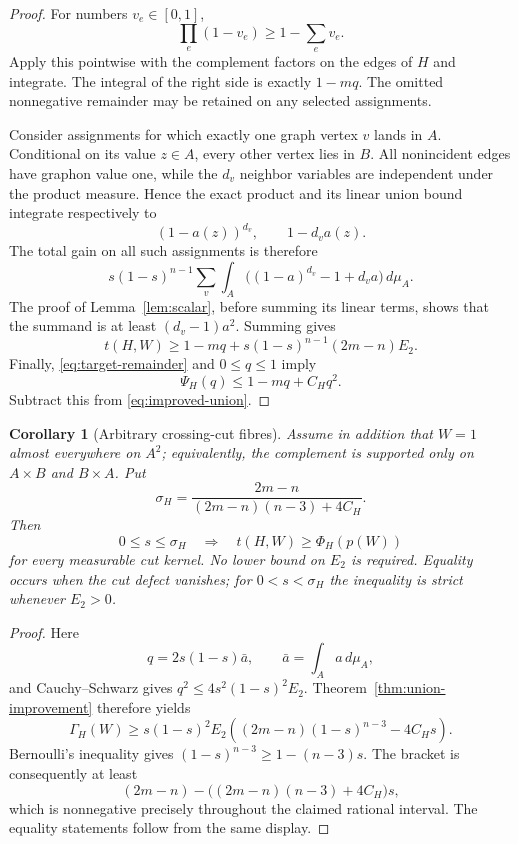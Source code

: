 \documentclass[11pt]{article}
\newtheorem{corollary}[theorem]{Corollary}
\newcommand{\dd}{\,d}
\begin{document}
\begin{proof}
For numbers $v_e\in[0,1]$,
\[
 \prod_e(1-v_e)\geq1-\sum_ev_e.
\]
Apply this pointwise with the complement factors on the edges of $H$ and
integrate.  The integral of the right side is exactly $1-mq$.  The omitted
nonnegative remainder may be retained on any selected assignments.

Consider assignments for which exactly one graph vertex $v$ lands in $A$.
Conditional on its value $z\in A$, every other vertex lies in $B$.  All
nonincident edges have graphon value one, while the $d_v$ neighbor variables
are independent under the product measure.  Hence the exact product and its
linear union bound integrate respectively to
\[
 (1-a(z))^{d_v},
 \qquad1-d_va(z).
\]
The total gain on all such assignments is therefore
\[
 s(1-s)^{n-1}\sum_v\int_A
 \bigl((1-a)^{d_v}-1+d_va\bigr)\dd\mu_A.
\]
The proof of Lemma~\ref{lem:scalar}, before summing its linear terms, shows
that the summand is at least $(d_v-1)a^2$.  Summing gives
\begin{equation}
 t(H,W)\geq1-mq+s(1-s)^{n-1}(2m-n)E_2.
 \label{eq:improved-union}
\end{equation}
Finally, \eqref{eq:target-remainder} and $0\leq q\leq1$ imply
\[
 \Psi_H(q)\leq1-mq+C_Hq^2.
\]
Subtract this from \eqref{eq:improved-union}.
\end{proof}

\begin{corollary}[Arbitrary crossing-cut fibres]
\label{cor:cut-only}
Assume in addition that $W=1$ almost everywhere on $A^2$; equivalently, the
complement is supported only on $A\times B$ and $B\times A$.  Put
\begin{equation}
 \sigma_H=
 \frac{2m-n}{(2m-n)(n-3)+4C_H}.
 \label{eq:fixed-radius}
\end{equation}
Then
\[
 0\leq s\leq\sigma_H
 \quad\Longrightarrow\quad
 t(H,W)\geq\Phi_H(p(W))
\]
for every measurable cut kernel.  No lower bound on $E_2$ is required.
Equality occurs when the cut defect vanishes; for $0<s<\sigma_H$ the
inequality is strict whenever $E_2>0$.
\end{corollary}

\begin{proof}
Here
\[
 q=2s(1-s)\bar a,
 \qquad \bar a=\int_Aa\dd\mu_A,
\]
and Cauchy--Schwarz gives $q^2\leq4s^2(1-s)^2E_2$.
Theorem~\ref{thm:union-improvement} therefore yields
\[
 \Gamma_H(W)\geq
 s(1-s)^2E_2
 \left((2m-n)(1-s)^{n-3}-4C_Hs\right).
\]
Bernoulli's inequality gives
$(1-s)^{n-3}\geq1-(n-3)s$.  The bracket is consequently at least
\[
 (2m-n)-\bigl((2m-n)(n-3)+4C_H\bigr)s,
\]
which is nonnegative precisely throughout the claimed rational interval.
The equality statements follow from the same display.
\end{proof}
\end{document}
